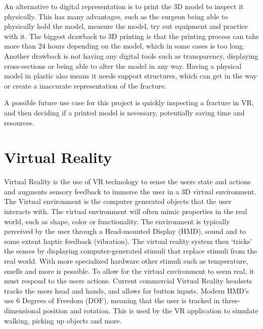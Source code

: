 \documentclass[a4paper]{report}
\begin{document}
An alternative to digital representation is to print the 3D model to inspect it physically\cite{mishra_virtual_2019}. This has many advantages, such as the surgeon being able to physically hold the model, measure the model, try out equipment and practice with it.
The biggest drawback to 3D printing is that the printing process can take more than 24 hours depending on the model, which in some cases is too long. Another drawback is not having any digital tools such as transparency, displaying cross-sections or being able to alter the model in any way. Having a physical model in plastic also means it needs support structures, which can get in the way or create a inaccurate representation of the fracture.

A possible future use case for this project is quickly inspecting a fracture in VR, and then deciding if a printed model is necessary, potentially saving time and resources.


\section{Virtual Reality}
Virtual Reality is the use of VR technology to sense the users state and actions and augments sensory feedback to immerse the user in a 3D virtual environment\cite{mihelj_virtual_2014}.
The Virtual environment is the computer generated objects that the user interacts with. The virtual environment will often mimic properties in the real world, such as shape, color or functionality.
The environment is typically perceived by the user through a Head-mounted Display (HMD), sound and to some extent haptic feedback (vibration). The virtual reality system then ‘tricks’ the senses by displaying computer-generated stimuli that replace stimuli from the real world. With more specialized hardware other stimuli such as temperature, smells and more is possible\cite{noauthor_feelreal_nodate}.
To allow for the virtual environment to seem real, it must respond to the users actions. Current commercial Virtual Reality headsets tracks the users head and hands, and allows for button inputs\cite{noauthor_oculus_nodate}. Modern HMD's use 6 Degrees of Freedom (DOF), meaning that the user is tracked in three-dimensional position and rotation\cite{lang_introduction_2013}. This is used by the VR application to simulate walking, picking up objects and more.
\end{document}
